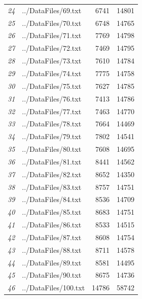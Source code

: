 \documentclass[12pt]{article}
\begin{document}
\begin{table}[ht]
{\begin{tabular}{rlrr}
								{\textit{24}} & ../DataFiles/69.txt & 6741 & 14801 \\ 
								{\textit{25}} & ../DataFiles/70.txt & 6748 & 14765 \\ 
								{\textit{26}} & ../DataFiles/71.txt & 7769 & 14798 \\ 
								{\textit{27}} & ../DataFiles/72.txt & 7469 & 14795 \\ 
								{\textit{28}} & ../DataFiles/73.txt & 7610 & 14784 \\ 
								{\textit{29}} & ../DataFiles/74.txt & 7775 & 14758 \\ 
								{\textit{30}} & ../DataFiles/75.txt & 7627 & 14785 \\ 
								{\textit{31}} & ../DataFiles/76.txt & 7413 & 14786 \\ 
								{\textit{32}} & ../DataFiles/77.txt & 7463 & 14770 \\ 
								{\textit{33}} & ../DataFiles/78.txt & 7664 & 14469 \\ 
								{\textit{34}} & ../DataFiles/79.txt & 7802 & 14541 \\ 
								{\textit{35}} & ../DataFiles/80.txt & 7608 & 14695 \\ 
								{\textit{36}} & ../DataFiles/81.txt & 8441 & 14562 \\ 
								{\textit{37}} & ../DataFiles/82.txt & 8652 & 14350 \\ 
								{\textit{38}} & ../DataFiles/83.txt & 8757 & 14751 \\ 
								{\textit{39}} & ../DataFiles/84.txt & 8536 & 14709 \\ 
								{\textit{40}} & ../DataFiles/85.txt & 8683 & 14751 \\ 
								{\textit{41}} & ../DataFiles/86.txt & 8533 & 14515 \\ 
								{\textit{42}} & ../DataFiles/87.txt & 8608 & 14754 \\ 
								{\textit{43}} & ../DataFiles/88.txt & 8711 & 14578 \\ 
								{\textit{44}} & ../DataFiles/89.txt & 8581 & 14495 \\ 
								{\textit{45}} & ../DataFiles/90.txt & 8675 & 14736 \\ 
								{\textit{46}} & ../DataFiles/100.txt & 14786 & 58742 \\ 
								\hline
							\end{tabular}
						}
				\end{table}
				\clearpage
\end{document}

